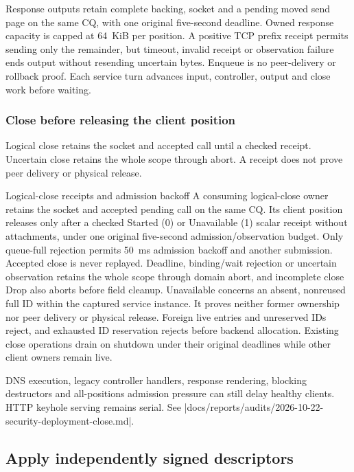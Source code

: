 Response outputs retain complete backing, socket and a pending moved send page
on the same CQ, with one original five-second deadline. Owned response capacity
is capped at 64~KiB per position. A positive TCP prefix receipt permits sending
only the remainder, but timeout, invalid receipt or observation failure ends output
without resending uncertain bytes. Enqueue is no peer-delivery or rollback proof.
Each service turn advances input, controller, output and close work before waiting.

\subsubsection{Close before releasing the client position}

Logical close retains the socket and accepted call until a checked receipt.
Uncertain close retains the whole scope through abort. A receipt does not prove
peer delivery or physical release.

\begin{implementationdetail}{Logical-close receipts and admission backoff}
A consuming logical-close owner retains the socket and accepted pending call on
the same CQ. Its client position releases only after a checked Started (0) or
Unavailable (1) scalar receipt without attachments, under one original five-second admission/observation budget.
Only queue-full rejection permits 50~ms admission backoff and another submission.
Accepted close is never replayed. Deadline, binding/wait rejection or uncertain
observation retains the whole scope through domain abort, and incomplete close Drop
also aborts before field cleanup. Unavailable concerns an absent, nonreused
full ID within the captured service instance. It proves neither former
ownership nor peer delivery or physical release. Foreign live entries and
unreserved IDs reject, and exhausted ID reservation rejects before backend allocation.
Existing close operations drain on shutdown under their original deadlines while
other client owners remain live.
\end{implementationdetail}

DNS execution, legacy controller handlers, response rendering, blocking
destructors and all-positions admission pressure can still delay healthy clients. HTTP keyhole
serving remains serial. See
\repofile|docs/reports/audits/2026-10-22-security-deployment-close.md|.

\subsection{Apply independently signed descriptors}

